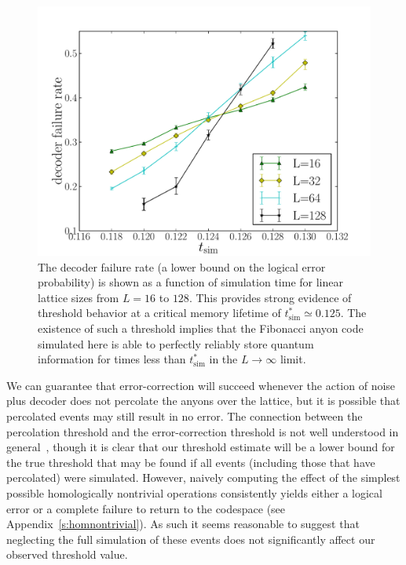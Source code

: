 \documentclass[aps, prl, letterpaper, twocolumn, superscriptaddress, notitlepage, 10pt]{revtex4-1}
\newcommand{\Aref}[1]{Appendix~\ref{#1}}
\begin{document}
\begin{figure}[t!]
\begin{center}
	\includegraphics[width=\columnwidth]{anyons-kyle.pdf}
\caption{The decoder failure rate (a lower bound on the logical error probability) is shown as a function of simulation time for linear lattice sizes from $L=16$ to $128$. 
This provides strong evidence of threshold behavior at a critical memory lifetime of $t_{\mathrm{sim}}^*\simeq 0.125$. 
The existence of such a threshold implies that the Fibonacci anyon code simulated here is able to perfectly reliably store quantum information for times less than $t_{\mathrm{sim}}^*$ in the $L\to \infty$ limit.}
\label{f:threshold}
\end{center}
\vspace{-10pt}
\end{figure}

We can guarantee that error-correction will succeed whenever
the action of noise plus decoder 
does not percolate the anyons over the lattice,
but it is possible that percolated events may still result in no error. 
The connection between the percolation threshold and the error-correction threshold 
is not well understood in general~\cite{Hastings2014}, though it is clear 
that our threshold estimate will be a lower bound for 
the true threshold that may be found if all events 
(including those that have percolated) were simulated.
However, naively computing the effect of the simplest possible homologically nontrivial operations consistently yields either a logical error or a complete failure to return to the codespace (see \Aref{s:homnontrivial}). As such it seems reasonable to suggest that neglecting the full simulation of 
these events does not significantly affect our observed threshold value.
\end{document}
